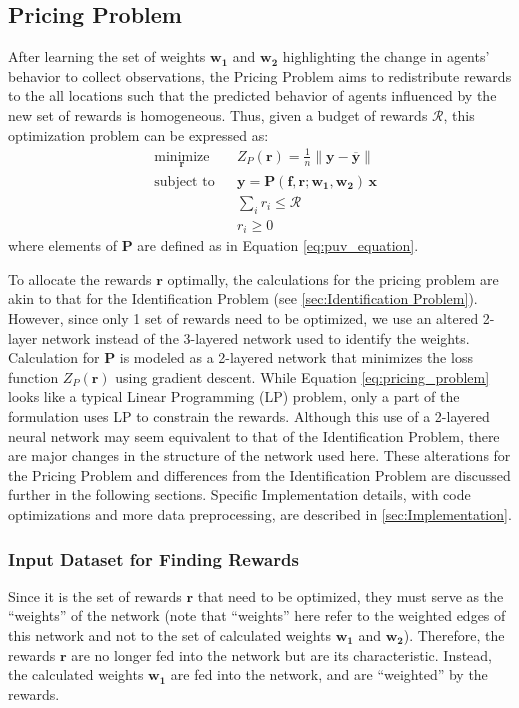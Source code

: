\documentclass[12pt]{article}
\newcommand{\vect}[1]{\mathbf{#1}}  %
\newcommand{\matr}[1]{\mathbf{#1}}  %
\newcommand{\mean}[1]{\overline{#1}}    %
\begin{document}
    \subsection{Pricing Problem} \label{sec:Pricing Problem}
    After learning the set of weights $\matr{w_1}$ and $\matr{w_2}$ highlighting the change in agents' behavior to collect observations, the Pricing Problem aims to redistribute rewards to the all locations such that the predicted behavior of agents influenced by the new set of rewards is homogeneous. Thus, given a budget of rewards $\mathcal{R}$, this optimization problem can be expressed as:
    \begin{equation} \label{eq:pricing_problem}
        \begin{aligned}
            & \underset{\vect{r}}{\text{minimize}}
            & & Z_P(\vect{r}) = \frac{1}{n}\lVert \vect{y} - \mean{\vect{y}} \rVert\\
            & \text{subject to}
            & & \vect{y} = \matr{P}(\matr{f}, \vect{r}; \matr{w_1}, \matr{w_2}) \, \vect{x}\\
            &&& \sum_{i} r_i \leq \mathcal{R}\\
            &&& r_i \geq 0
        \end{aligned}
    \end{equation}
    where elements of $\matr{P}$ are defined as in Equation \ref{eq:puv_equation}.
    
    To allocate the rewards $\vect{r}$ optimally, the calculations for the pricing problem are akin to that for the Identification Problem (see \cref{sec:Identification Problem}). However, since only 1 set of rewards need to be optimized, we use an altered 2-layer network instead of the 3-layered network used to identify the weights. Calculation for $\matr{P}$ is modeled as a 2-layered network that minimizes the loss function $Z_P(\vect{r})$ using gradient descent. While Equation \ref{eq:pricing_problem} looks like a typical Linear Programming (LP) problem, only a part of the formulation uses LP to constrain the rewards.  Although this use of a 2-layered neural network may seem equivalent to that of the Identification Problem, there are major changes in the structure of the network used here. These alterations for the Pricing Problem and differences from the Identification Problem are discussed further in the following sections. Specific Implementation details, with code optimizations and more data preprocessing, are described in \cref{sec:Implementation}.
    
    \subsubsection{Input Dataset for Finding Rewards}
    Since it is the set of rewards $\vect{r}$ that need to be optimized, they must serve as the ``weights'' of the network (note that ``weights'' here refer to the weighted edges of this network and not to the set of calculated weights $\matr{w_1}$ and $\matr{w_2}$). Therefore, the rewards $\vect{r}$ are no longer fed into the network but are its characteristic. Instead, the calculated weights $\matr{w_1}$ are fed into the network, and are ``weighted'' by the rewards.
    
\end{document}
